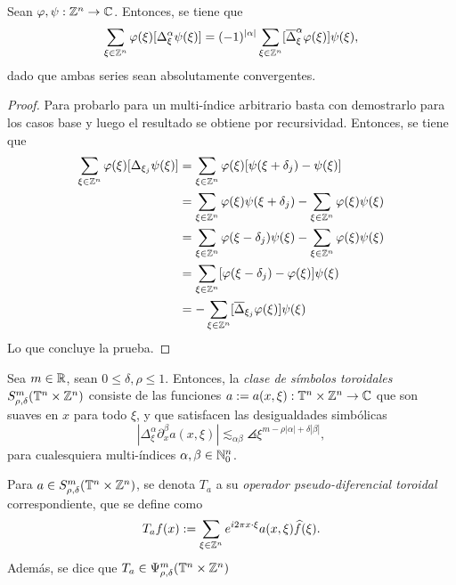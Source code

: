 \begin{proposition}
	Sean $\varphi,\psi:\mathbb{Z}^n\to\mathbb{C}$. Entonces, se tiene que 
	\begin{equation*}
		\sum_{\xi\in\mathbb{Z}^n}\varphi(\xi) [\Delta^\alpha_\xi\psi(\xi)] = (-1)^{|\alpha|}\sum_{\xi\in\mathbb{Z}^n} [\overline{\Delta}^\alpha_\xi\varphi(\xi)]\psi(\xi),
	\end{equation*}
	dado que ambas series sean absolutamente convergentes.
\end{proposition}
\begin{proof}
	Para probarlo para un multi-índice arbitrario basta con demostrarlo para los casos base y luego el resultado se obtiene por recursividad. Entonces, se tiene que 
	\begin{align*}
		\sum_{\xi\in\mathbb{Z}^n}\varphi(\xi) [\Delta_{\xi_j}\psi(\xi)] & = \sum_{\xi\in\mathbb{Z}^n}\varphi(\xi) [\psi(\xi+\delta_j) - \psi(\xi)] \\
		& = \sum_{\xi\in\mathbb{Z}^n}\varphi(\xi) \psi(\xi+\delta_j) - \sum_{\xi\in\mathbb{Z}^n}\varphi(\xi) \psi(\xi) \\
		& = \sum_{\xi\in\mathbb{Z}^n}\varphi(\xi-\delta_j) \psi(\xi) - \sum_{\xi\in\mathbb{Z}^n}\varphi(\xi) \psi(\xi) \\
		& = \sum_{\xi\in\mathbb{Z}^n}[\varphi(\xi-\delta_j) - \varphi(\xi)]\psi(\xi) \\
		& = -\sum_{\xi\in\mathbb{Z}^n} [\overline{\Delta}_{\xi_j}\varphi(\xi)]\psi(\xi)
	\end{align*}
	Lo que concluye la prueba.
\end{proof}
\begin{definition}
	Sea $m\in\mathbb{R}$, sean $0\leq\delta,\rho\leq1$. Entonces, la \textit{clase de símbolos toroidales} $S^m_{\rho, \delta}(\mathbb{T}^n\times\mathbb{Z}^n)$ consiste de las funciones $a:=a(x, \xi):\mathbb{T}^n\times\mathbb{Z}^n\to\mathbb{C}$ que son suaves en $x$ para todo $\xi$, y que satisfacen las desigualdades simbólicas
	\begin{equation*}
		|\Delta^\alpha_\xi\partial^\beta_x a(x, \xi)| \lesssim_{\alpha\beta} \angles{\xi}^{m-\rho|\alpha|+\delta|\beta|}, 
	\end{equation*}
	para cualesquiera multi-índices $\alpha,\beta\in\mathbb{N}_0^n$. 
\end{definition}
\begin{definition}
	Para $a\in S^m_{\rho, \delta}(\mathbb{T}^n\times\mathbb{Z}^n)$, se denota $T_a$ a su \textit{operador pseudo-diferencial toroidal} correspondiente, que se define como 
	\begin{equation*}
		T_af(x) := \sum_{\xi\in\mathbb{Z}^n} e^{i2\pi x\cdot\xi} a(x, \xi)\widehat{f}(\xi).
	\end{equation*}
	Además, se dice que $T_a\in\Psi^m_{\rho, \delta}(\mathbb{T}^n\times\mathbb{Z}^n)$
\end{definition}
